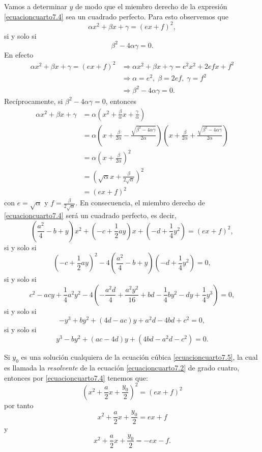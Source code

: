 Vamos a determinar $y$ de modo que el miembro derecho de la expresión \eqref{ecuacioncuarto7.4} sea un cuadrado perfecto. Para esto observemos que
$$\alpha x^2+\beta x+\gamma =(ex+f)^2,$$
si y solo si
$$\beta ^2-4\alpha \gamma =0.$$
En efecto
\begin{align*}
    \alpha x^2+\beta x+\gamma =(ex+f)^2 & \Longrightarrow \alpha x^2+\beta x+\gamma =e^2x^2+2efx+f^2 \\ 
    & \Longrightarrow \alpha =e^2, \; \beta =2ef, \; \gamma =f^2 \\ 
    & \Longrightarrow \beta ^2-4\alpha \gamma =0.
\end{align*}
Recíprocamente, si $\beta ^2-4\alpha \gamma =0$, entonces
\begin{align*}
    \alpha x^2+\beta x+\gamma  &=\alpha  \left( x^2+\frac{\beta }{\alpha }x+\frac{\gamma }{\alpha } \right) \\
    &=\alpha  \left( x+\frac{\beta }{2\alpha }-\frac{\sqrt{\beta ^2-4\alpha \gamma }}{2\alpha } \right) \left( x+\frac{\beta }{2\alpha }+\frac{\sqrt{\beta ^2-4\alpha \gamma }}{2\alpha } \right) \\
    &=\alpha  \left( x+\frac{\beta }{2\alpha } \right)^2 \\
    &=\left( \sqrt{\alpha }x+\frac{\beta }{2\sqrt{\alpha }} \right)^2 \\
    &=(ex+f)^2
\end{align*}
con $e=\sqrt{\alpha }$ y $\displaystyle f=\frac{\beta }{2\sqrt{\alpha }}$. En consecuencia, el miembro derecho de \eqref{ecuacioncuarto7.4} será un cuadrado perfecto, es decir,
$$\left( \frac{a^2}{4}-b+y \right) x^2+\left( -c+\frac{1}{2}ay \right) x + \left( -d+\frac{1}{4}y^2 \right) = (ex+f)^2,$$
si y solo si
$$\left( -c+\frac{1}{2}ay \right)^2 -4 \left( \frac{a^2}{4}-b+y \right) \left( -d+\frac{1}{4}y^2 \right) =0,$$
si y solo si
$$c^2-acy+\frac{1}{4}a^2y^2-4 \left( -\frac{a^2d}{4}+\frac{a^2y^2}{16}+bd-\frac{1}{4}by^2-dy+\frac{1}{4} y^3 \right) =0,$$
si y solo si
$$-y^3+by^2+(4d-ac)y+a^2d-4bd+c^2=0,$$
si y solo si
\begin{equation}
    y^3-by^2+(ac-4d)y+\left(4bd-a^2d-c^2\right)=0. \label{ecuacioncuarto7.5}
\end{equation}

Si $y_0$ es una solución cualquiera de la ecuación cúbica \eqref{ecuacioncuarto7.5}, la cual es llamada la \textit{resolvente} de la ecuación \eqref{ecuacioncuarto7.2} de grado cuatro, entonces por \eqref{ecuacioncuarto7.4} tenemos que:
$$\left( x^2+\frac{a}{2}x+\frac{y_0}{2} \right)^2 = (ex+f)^2$$
por tanto
\begin{equation}
    x^2+\frac{a}{2}x+\frac{y_0}{2}=ex+f \label{ecuacioncuarto7.6}
\end{equation}
y
\begin{equation}
    x^2+\frac{a}{2}x+\frac{y_0}{2}=-ex-f. \label{ecuacioncuarto7.7}
\end{equation}

